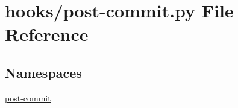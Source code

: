 \section{hooks/post-\/commit.py File Reference}
\label{post-commit_8py}
\subsection*{Namespaces}
\begin{DoxyCompactItemize}
\item 
\hyperlink{namespacepost-commit}{post-\/commit}
\end{DoxyCompactItemize}
